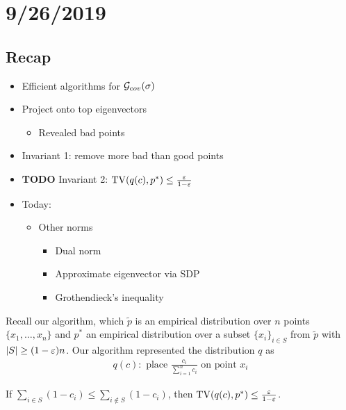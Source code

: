 \section{9/26/2019}

\subsection{Recap}%

\begin{itemize}
  \item Efficient algorithms for $\mathcal{G}_{cov}(\sigma)$
  \item Project onto top eigenvectors
    \begin{itemize}
      \item Revealed bad points
    \end{itemize}
  \item Invariant 1: remove more bad than good points
  \item \textbf{TODO} Invariant 2: $\operatorname{TV}(q(c), p^*) \leq \frac{\varepsilon}{1-\varepsilon}$
  \item Today:
    \begin{itemize}
      \item Other norms
        \begin{itemize}
          \item Dual norm
          \item Approximate eigenvector via SDP
          \item Grothendieck's inequality
        \end{itemize}
    \end{itemize}
\end{itemize}

Recall our algorithm, which $\tilde{p}$ is an empirical
distribution over $n$ points $\{x_1, \ldots, x_n\}$ and
$p^*$ an empirical distribution over a subset $\{x_i\}_{i \in S}$
from $\tilde{p}$ with $\lvert S \rvert \geq (1 - \varepsilon) n$.
Our algorithm represented the distribution $q$ as
\begin{align}
  q(c) : \text{ place }\frac{c_i}{\sum_{i=1}^n c_i}\text{ on point }x_i
\end{align}

\begin{proposition}
  If $\sum_{i \in S} (1 - c_i) \leq \sum_{i \not\in S} (1 - c_i)$,
  then $\operatorname{TV}(q(c), p^*) \leq \frac{\varepsilon}{1-\varepsilon}$.
\end{proposition}

